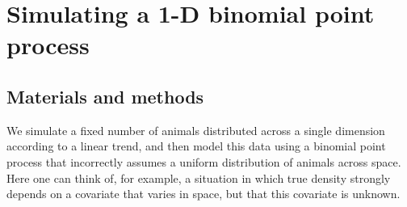 \documentclass[a4paper,12pt]{article}
\begin{document}


%
%



\section{Simulating a 1-D binomial point process} \label{1dbinom}

\subsection{Materials and methods}
We simulate a fixed number of animals distributed across a single dimension according to a linear trend, and then model this data using a binomial point process that incorrectly assumes a uniform distribution of animals across space. Here one can think of, for example, a situation in which true density strongly depends on a covariate that varies in space, but that this covariate is unknown. 
\end{document}
